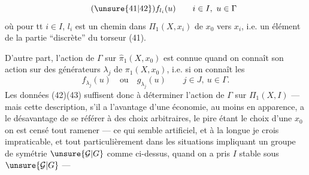 \[
\tag{\unsure{41|42}}f_{l_i}(u)\qquad i\in I,\ u\in\Gamma
\]
où pour tt $i\in I$, $l_i$ est un chemin dans $\Pi_1(X,x_i)$ de $x_0$ vers $x_i$, i.e. un élément de la partie ``discrète'' du torseur (41).

D'autre part, l'action de $\Gamma$ sur $\widehat\pi_1(X,x_0)$ est connue quand on connaît son action sur des générateurs $\lambda_j$  de $\pi_1(X,x_0)$, i.e. si on connaît les
\[
\tag{43}f_{\lambda_j}(u)\quad\text{ou}\quad g_{\lambda_j}(u)\qquad j\in J,\ u\in\Gamma.
\]
 Les données (42)(43) suffisent donc à déterminer l'action de $\Gamma$ sur $\Pi_1(X,I)$ --- mais cette description,   s'il a l'avantage d'une économie, au moins en apparence, a le désavantage de se référer à des choix arbitraires, le pire étant le choix d'une   $x_0$   on est censé tout ramener --- ce qui semble artificiel, et à la longue je crois impraticable,  et tout particulièrement dans les situations impliquant un groupe de symétrie $\unsure{\mathcal G|G}$ comme ci-dessus, quand on a pris $I$ stable sous $\unsure{\mathcal G|G}$ ---
